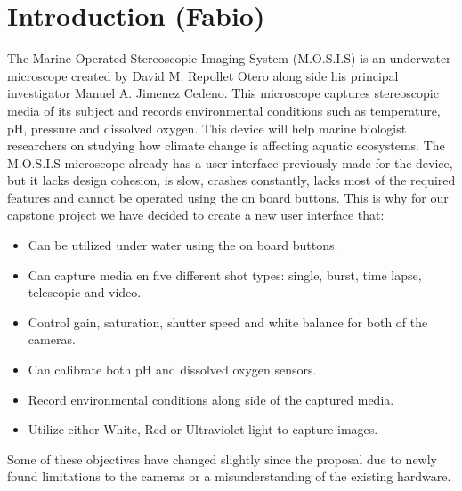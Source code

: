 \section{Introduction (Fabio)}
The Marine Operated Stereoscopic Imaging System (M.O.S.I.S) is an underwater microscope created by David M. Repollet Otero along side his principal investigator Manuel A. Jimenez Cedeno. This microscope captures stereoscopic media of its subject and records environmental conditions such as temperature, pH, pressure and dissolved oxygen. This device will help marine biologist researchers on studying how climate change is affecting aquatic ecosystems. The M.O.S.I.S microscope already has a user interface previously made for the device, but it lacks design cohesion, is slow, crashes constantly, lacks most of the required features and cannot be operated using the on board buttons. This is why for our capstone project we have decided to create a new user interface that:
\begin{itemize}
	\item Can be utilized under water using the on board buttons.
	\item Can capture media en five different shot types: single, burst, time lapse, telescopic and video.
	\item Control gain, saturation, shutter speed and white balance for both of the cameras.
	\item Can calibrate both pH and dissolved oxygen sensors.
	\item Record environmental conditions along side of the captured media.
	\item Utilize either White, Red or Ultraviolet light to capture images.
\end{itemize}
Some of these objectives have changed slightly since the proposal due to newly found limitations to the cameras or a misunderstanding of the existing hardware.\\
